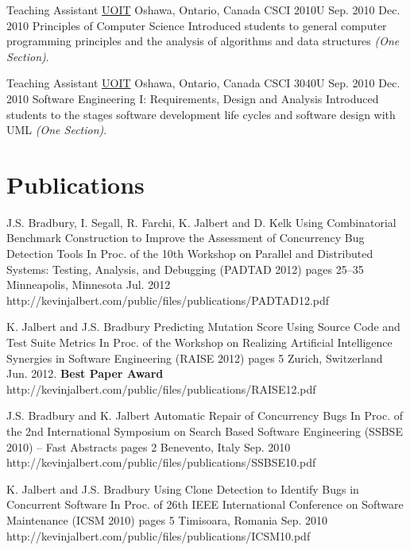   \teachingEntry
    {Teaching Assistant}
    {\href{http://www.uoit.ca/}{UOIT}}
    {Oshawa, Ontario, Canada}
    {CSCI 2010U}
    {Sep. 2010}
    {Dec. 2010}
    {Principles of Computer Science}
    {Introduced students to general computer programming principles and the analysis of algorithms and data structures \textit{(One Section)}.}

  \teachingEntry
    {Teaching Assistant}
    {\href{http://www.uoit.ca/}{UOIT}}
    {Oshawa, Ontario, Canada}
    {CSCI 3040U}
    {Sep. 2010}
    {Dec. 2010}
    {Software Engineering I: Requirements, Design and Analysis}
    {Introduced students to the stages software development life cycles and software design with UML \textit{(One Section)}.}

  \section{Publications}

  \publicationEntry
    {J.S. Bradbury, I. Segall, R. Farchi, K. Jalbert and D. Kelk}
    {Using Combinatorial Benchmark Construction to Improve the Assessment of Concurrency Bug Detection Tools}
    {In Proc. of the 10th Workshop on Parallel and Distributed Systems: Testing, Analysis, and Debugging (PADTAD 2012)}
    {pages 25--35}
    {Minneapolis, Minnesota}
    {Jul. 2012}
    {http://kevinjalbert.com/public/files/publications/PADTAD12.pdf}

  \publicationEntry
    {K. Jalbert and J.S. Bradbury}
    {Predicting Mutation Score Using Source Code and Test Suite Metrics}
    {In Proc. of the Workshop on Realizing Artificial Intelligence Synergies in Software Engineering (RAISE 2012)}
    {pages 5}
    {Zurich, Switzerland}
    {Jun. 2012. \textbf{Best Paper Award}}
    {http://kevinjalbert.com/public/files/publications/RAISE12.pdf}

  \publicationEntry
    {J.S. Bradbury and K. Jalbert}
    {Automatic Repair of Concurrency Bugs}
    {In Proc. of the 2nd International Symposium on Search Based Software Engineering (SSBSE 2010) -- Fast Abstracts}
    {pages 2}
    {Benevento, Italy}
    {Sep. 2010}
    {http://kevinjalbert.com/public/files/publications/SSBSE10.pdf}

  \publicationEntry
    {K. Jalbert and J.S. Bradbury}
    {Using Clone Detection to Identify Bugs in Concurrent Software}
    {In Proc. of 26th IEEE International Conference on Software Maintenance (ICSM 2010)}
    {pages 5}
    {Timisoara, Romania}
    {Sep. 2010}
    {http://kevinjalbert.com/public/files/publications/ICSM10.pdf}

